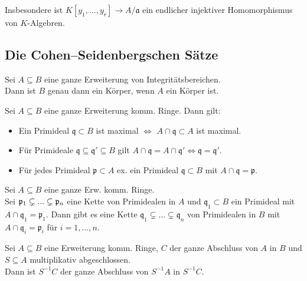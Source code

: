 \documentclass{cheat-sheet}
\newcommand{\aaa}{\mathfrak{a}}
\newcommand{\ppp}{\mathfrak{p}}
\newcommand{\qqq}{\mathfrak{q}}
\begin{document}
\begin{bem}
  Insbesondere ist $K[y_1, \ldots, y_r] \to A/\aaa$ ein endlicher injektiver Homomorphismus von $K$-Algebren.
\end{bem}

\subsection{Die Cohen--Seidenbergschen Sätze}


\begin{prop}
  Sei $A \subseteq B$ eine ganze Erweiterung von Integritätsbereichen. \\
  Dann ist $B$ genau dann ein Körper, wenn $A$ ein Körper ist.
\end{prop}

\begin{prop}
  Sei $A \subseteq B$ eine ganze Erweiterung komm. Ringe.
  Dann gilt:
  \begin{itemize}
    \item Ein Primideal $\qqq \subset B$ ist maximal $\iff$ $A \cap \qqq \subset A$ ist maximal.
    \item Für Primideale $\qqq \subseteq \qqq' \subseteq B$ gilt $A \cap \qqq = A \cap \qqq' \iff \qqq = \qqq'$.
    \item Für jedes Primideal $\ppp \subset A$ ex. ein Primideal $\qqq \subset B$ mit $A \cap \qqq = \ppp$.
  \end{itemize}
\end{prop}

\begin{satz}
  Sei $A \subseteq B$ eine ganze Erw. komm. Ringe. \\
  Sei $\ppp_1 \subsetneq \nldots \subsetneq \ppp_n$ eine Kette von Primidealen in $A$ und $\qqq_1 \subset B$ ein Primideal mit $A \cap \qqq_1 = \ppp_1$.
  Dann gibt es eine Kette $\qqq_1 \subsetneq \ldots \subsetneq \qqq_n$ von Primidealen in $B$ mit $A \cap \qqq_i = \ppp_i$ für $i = 1, \ldots, n$.
\end{satz}



\begin{prop}
  Sei $A \subseteq B$ eine Erweiterung komm. Ringe,
  $C$ der ganze Abschluss von $A$ in $B$ und
  $S \subseteq A$ multiplikativ abgeschlossen. \\
  Dann ist $S^{-1} C$ der ganze Abschluss von $S^{-1} A$ in $S^{-1} C$.
\end{prop}
\end{document}
